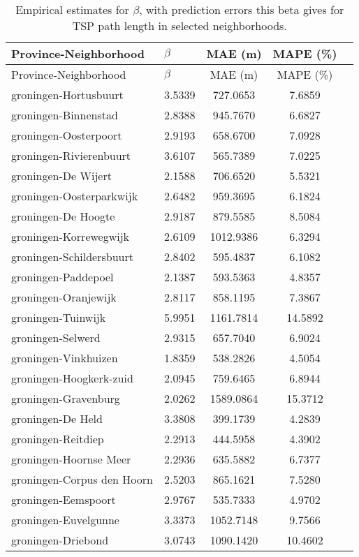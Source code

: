 \begin{longtable}{llccc}
\caption{Empirical estimates for $\beta$, with prediction errors this beta gives for TSP path length in selected neighborhoods.} \label{tab:results}\\
\hline
Province-Neighborhood & $\beta$ & MAE (m) & MAPE (\%) \\
\hline
\endfirsthead
\hline
Province-Neighborhood & $\beta$ & MAE (m) & MAPE (\%) \\
\hline
\endhead
groningen-Hortusbuurt & 3.5339 & 727.0653 & 7.6859 \\
groningen-Binnenstad & 2.8388 & 945.7670 & 6.6827 \\
groningen-Oosterpoort & 2.9193 & 658.6700 & 7.0928 \\
groningen-Rivierenbuurt & 3.6107 & 565.7389 & 7.0225 \\
groningen-De Wijert & 2.1588 & 706.6520 & 5.5321 \\
groningen-Oosterparkwijk & 2.6482 & 959.3695 & 6.1824 \\
groningen-De Hoogte & 2.9187 & 879.5585 & 8.5084 \\
groningen-Korrewegwijk & 2.6109 & 1012.9386 & 6.3294 \\
groningen-Schildersbuurt & 2.8402 & 595.4837 & 6.1082 \\
groningen-Paddepoel & 2.1387 & 593.5363 & 4.8357 \\
groningen-Oranjewijk & 2.8117 & 858.1195 & 7.3867 \\
groningen-Tuinwijk & 5.9951 & 1161.7814 & 14.5892 \\
groningen-Selwerd & 2.9315 & 657.7040 & 6.9024 \\
groningen-Vinkhuizen & 1.8359 & 538.2826 & 4.5054 \\
groningen-Hoogkerk-zuid & 2.0945 & 759.6465 & 6.8944 \\
groningen-Gravenburg & 2.0262 & 1589.0864 & 15.3712 \\
groningen-De Held & 3.3808 & 399.1739 & 4.2839 \\
groningen-Reitdiep & 2.2913 & 444.5958 & 4.3902 \\
groningen-Hoornse Meer & 2.2936 & 635.5882 & 6.7377 \\
groningen-Corpus den Hoorn & 2.5203 & 865.1621 & 7.5280 \\
groningen-Eemspoort & 2.9767 & 535.7333 & 4.9702 \\
groningen-Euvelgunne & 3.3373 & 1052.7148 & 9.7566 \\
groningen-Driebond & 3.0743 & 1090.1420 & 10.4602 \\

\end{longtable}
